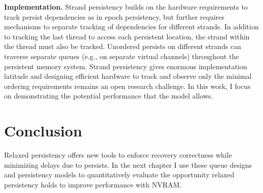 \textbf{Implementation.}
Strand persistency builds on the hardware requirements to track persist dependencies as in epoch persistency, but further requires mechanisms to separate tracking of dependencies for different strands.
In addition to tracking the last thread to access each persistent location, the strand within the thread must also be tracked.
Unordered persists on different strands can traverse separate queues (e.g., on separate virtual channels) throughout the persistent memory system.
Strand persistency gives enormous implementation latitude and designing efficient hardware to track and observe only the minimal ordering requirements remains an open research challenge.
In this work, I focus on demonstrating the potential performance that the model allows. 

\section{Conclusion}
\label{sec:PersistencyModels:Conclusion}

Relaxed persistency offers new tools to enforce recovery correctness while minimizing delays due to persists.
In the next chapter I use these queue designs and persistency models to quantitatively evaluate the opportunity relaxed persistency holds to improve performance with NVRAM.

